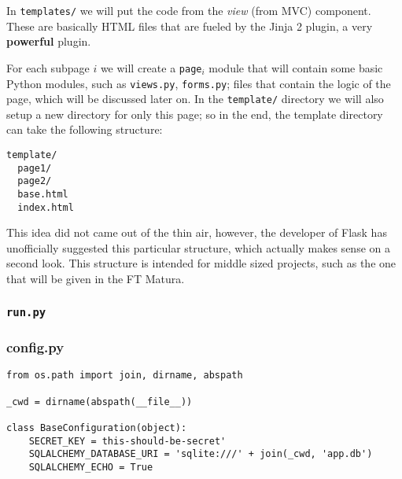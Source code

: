 \documentclass[../main/main.tex]{subfiles}
\begin{document}
In \lstinline|templates/| we will put the code from the \textit{view}
(from MVC) component. These are basically HTML files that are fueled
by the Jinja 2 plugin, a very \textbf{powerful} plugin. 

For each subpage $i$ we will create a \lstinline|page|$_i$ module that
will contain some basic Python modules, such as \lstinline|views.py|,
\lstinline|forms.py|; files that contain the logic of the page, which
will be discussed later on. In the \lstinline|template/| directory we
will also setup a new directory for only this page; so in the end, the
template directory can take the following structure: 

\begin{lstlisting}
template/
  page1/
  page2/
  base.html
  index.html
\end{lstlisting}

This idea did not came out of the thin air, however, the developer of
Flask has unofficially suggested \cite{mitsuhiko:flask} this particular structure, which
actually makes sense on a second look. This structure is intended for
middle sized projects, such as the one that will be given in the FT
Matura. 

\subsubsection{\lstinline|run.py|}

\subsubsection{config.py}

\begin{lstlisting}
from os.path import join, dirname, abspath

_cwd = dirname(abspath(__file__))

class BaseConfiguration(object):
    SECRET_KEY = this-should-be-secret'
    SQLALCHEMY_DATABASE_URI = 'sqlite:///' + join(_cwd, 'app.db')
    SQLALCHEMY_ECHO = True
\end{lstlisting}



\end{document}
